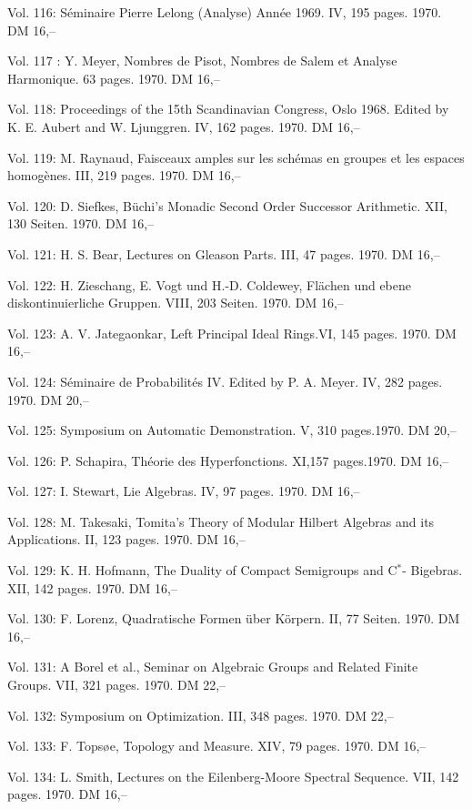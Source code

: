 Vol. 116: Séminaire Pierre Lelong (Analyse) Année 1969. IV, 195 pages. 1970. DM 16,--

Vol. 117 : Y. Meyer, Nombres de Pisot, Nombres de Salem et Analyse Harmonique. 63 pages. 1970. DM 16,--

Vol. 118: Proceedings of the 15th Scandinavian Congress, Oslo 1968. Edited by K. E. Aubert and W. Ljunggren. IV, 162 pages. 1970. DM 16,--

Vol. 119: M. Raynaud, Faisceaux amples sur les schémas en groupes et les espaces homogènes. III, 219 pages. 1970. DM 16,--

Vol. 120: D. Siefkes, Büchi's Monadic Second Order Successor Arithmetic. XII, 130 Seiten. 1970. DM 16,--

Vol. 121: H. S. Bear, Lectures on Gleason Parts. III, 47 pages. 1970. DM 16,--

Vol. 122: H. Zieschang, E. Vogt und H.-D. Coldewey, Flächen und ebene diskontinuierliche Gruppen. VIII, 203 Seiten. 1970. DM 16,--

Vol. 123: A. V. Jategaonkar, Left Principal Ideal Rings.VI, 145 pages. 1970. DM 16,--

Vol. 124: Séminaire de Probabilités IV. Edited by P. A. Meyer. IV, 282 pages. 1970. DM 20,--

Vol. 125: Symposium on Automatic Demonstration. V, 310 pages.1970. DM 20,--

Vol. 126: P. Schapira, Théorie des Hyperfonctions. XI,157 pages.1970. DM 16,--

Vol. 127: I. Stewart, Lie Algebras. IV, 97 pages. 1970. DM 16,--

Vol. 128: M. Takesaki, Tomita's Theory of Modular Hilbert Algebras and its Applications. II, 123 pages. 1970. DM 16,--

Vol. 129: K. H. Hofmann, The Duality of Compact Semigroups and C$^*$- Bigebras. XII, 142 pages. 1970. DM 16,--

Vol. 130: F. Lorenz, Quadratische Formen über Körpern. II, 77 Seiten. 1970. DM 16,--

Vol. 131: A Borel et al., Seminar on Algebraic Groups and Related Finite Groups. VII, 321 pages. 1970. DM 22,--

Vol. 132: Symposium on Optimization. III, 348 pages. 1970. DM 22,--

Vol. 133: F. Topsøe, Topology and Measure. XIV, 79 pages. 1970. DM 16,--

Vol. 134: L. Smith, Lectures on the Eilenberg-Moore Spectral Sequence. VII, 142 pages. 1970. DM 16,--

